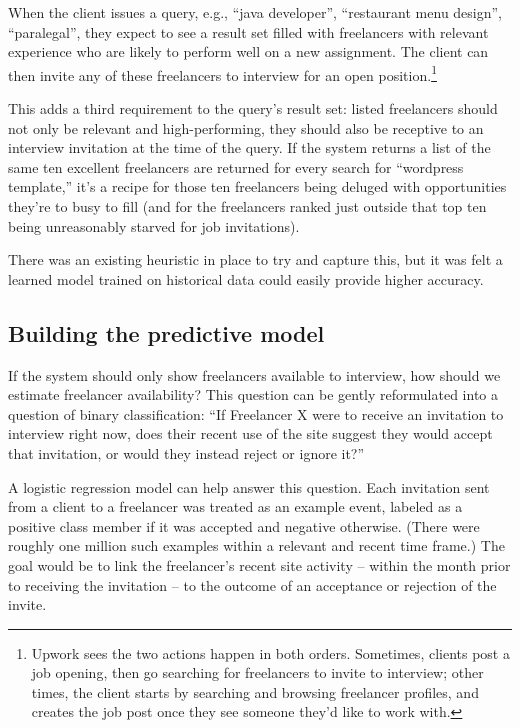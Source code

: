 \documentclass{article}
\begin{document}
When the client issues a query, e.g., ``java developer'', ``restaurant menu design'', ``paralegal'', they expect to see a result set filled with freelancers with relevant experience who are likely to perform well on a new assignment. The client can then invite any of these freelancers to interview for an open position.\footnote{Upwork sees the two actions happen in both orders. Sometimes, clients post a job opening, then go searching for freelancers to invite to interview; other times, the client starts by searching and browsing freelancer profiles, and creates the job post once they see someone they'd like to work with.}

This adds a third requirement to the query's result set: listed freelancers should not only be relevant and high-performing, they should also be receptive to an interview invitation at the time of the query. If the system returns a list of the same ten excellent freelancers are returned for every search for ``wordpress template,'' it's a recipe for those ten freelancers being deluged with opportunities they're to busy to fill (and for the freelancers ranked just outside that top ten being unreasonably starved for job invitations).

There was an existing heuristic in place to try and capture this, but it was felt a learned model trained on historical data could easily provide higher accuracy.

\subsection{Building the predictive model}

If the system should only show freelancers available to interview, how should we estimate freelancer availability? This question can be gently reformulated into a question of binary classification: ``If Freelancer X were to receive an invitation to interview right now, does their recent use of the site suggest they would accept that invitation, or would they instead reject or ignore it?''

A logistic regression model can help answer this question. Each invitation sent from a client to a freelancer was treated as an example event, labeled as a positive class member if it was accepted and negative otherwise. (There were roughly one million such examples within a relevant and recent time frame.) The goal would be to link the freelancer's recent site activity -- within the month prior to receiving the invitation -- to the outcome of an acceptance or rejection of the invite.
\end{document}

